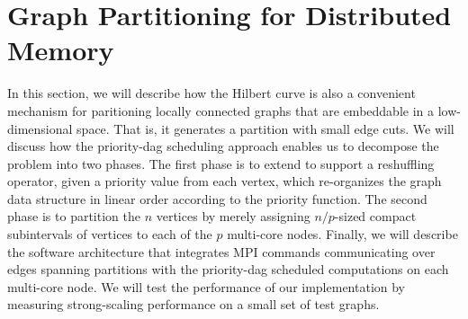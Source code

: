 \section{Graph Partitioning for Distributed Memory}
\label{sec:partitions}

In this section, we will describe how the Hilbert curve is also
a convenient mechanism for paritioning locally connected graphs
that are embeddable in a low-dimensional space.  That is, it 
generates a partition with small edge cuts.  We will discuss how
the priority-dag scheduling approach enables us to decompose the 
problem into two phases.  The first phase is to extend 
to support a reshuffling operator, given a priority value from each
vertex, which re-organizes the graph data structure in linear order 
according to the priority function.  The second phase is to partition
the $n$ vertices by merely assigning $n/p$-sized compact subintervals
of vertices to each of the $p$ multi-core nodes.  Finally, we 
will describe the software architecture that integrates MPI commands
communicating over edges spanning partitions with the priority-dag 
scheduled computations on each multi-core node.  We will test the
performance of our implementation by measuring strong-scaling
performance on a small set of test graphs.
